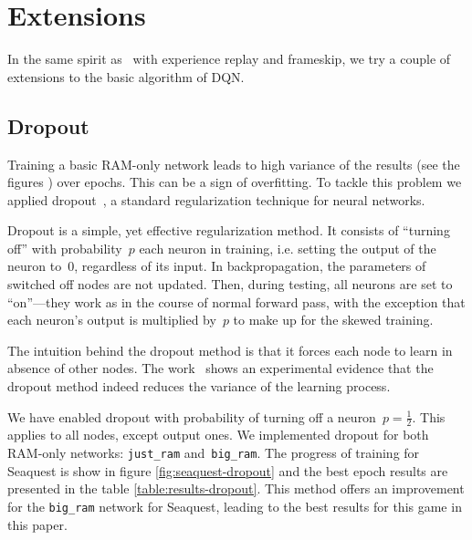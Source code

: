 \chapter{Extensions}\label{extensions}
In the same spirit as~\cite{nips-dqn} with experience replay and frameskip, we try a couple of extensions to the basic algorithm of DQN.

\section{Dropout}
Training a basic RAM-only network leads to high variance of the results (see the figures ) over epochs. This can be a sign of overfitting. To tackle this problem we applied dropout~\cite{dropout}, a standard regularization technique for neural networks.

Dropout is a simple, yet effective regularization method. It consists of ``turning off'' with probability~$p$ each neuron in training, i.e. setting the output of the neuron to~$0$, regardless of its input. In backpropagation, the parameters of switched off nodes are not updated. Then, during testing, all neurons are set to ``on''---they work as in the course of normal forward pass, with the exception that each neuron's output is multiplied by~$p$ to make up for the skewed training.

The intuition behind the dropout method is that it forces each node to learn in absence of other nodes. The work~\cite{dropout-variance} shows an experimental evidence that the dropout method indeed reduces the variance of the learning process.

We have enabled dropout with probability of turning off a neuron~$p = \frac{1}{2}$. This applies to all nodes, except output ones. We implemented dropout for both RAM-only networks: \texttt{just\_ram} and~\texttt{big\_ram}. The progress of training for Seaquest is show in figure \ref{fig:seaquest-dropout} and the best epoch results are presented in the table \ref{table:results-dropout}. This method offers an improvement for the \texttt{big\_ram} network for Seaquest, leading to the best results for this game in this paper.

